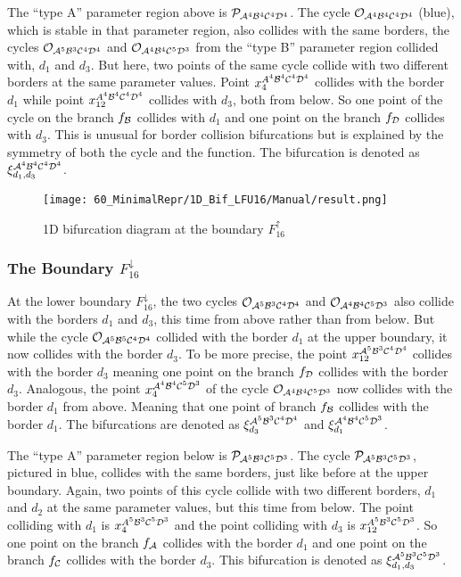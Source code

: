 The ``type A'' parameter region above is $\mathcal{P}_{\mathcal{A}^4\mathcal{B}^4\mathcal{C}^4\mathcal{D}^4}$.
The cycle $\mathcal{O}_{\mathcal{A}^4\mathcal{B}^4\mathcal{C}^4\mathcal{D}^4}$ (blue), which is stable in that parameter region, also collides with the same borders, the cycles $\mathcal{O}_{\mathcal{A}^5\mathcal{B}^3\mathcal{C}^4\mathcal{D}^4}$ and $\mathcal{O}_{\mathcal{A}^4\mathcal{B}^4\mathcal{C}^5\mathcal{D}^3}$ from the ``type B'' parameter region collided with, $d_1$ and $d_3$.
But here, two points of the same cycle collide with two different borders at the same parameter values.
Point $x_{4}^{A^4\mathcal{B}^4\mathcal{C}^4\mathcal{D}^4}$ collides with the border $d_1$ while point $x_{12}^{A^4\mathcal{B}^4\mathcal{C}^4\mathcal{D}^4}$ collides with $d_3$, both from below.
So one point of the cycle on the branch $f_{\mathcal{B}}$ collides with $d_1$ and one point on the branch $f_{\mathcal{D}}$ collides with $d_3$.
This is unusual for border collision bifurcations but is explained by the symmetry of both the cycle and the function.
The bifurcation is denoted as $\xi_{d_1, d_3}^{\mathcal{A}^4\mathcal{B}^4\mathcal{C}^4\mathcal{D}^4}$.

\begin{figure}
	\centering
	\texttt{[image: 60\_MinimalRepr/1D\_Bif\_LFU16/Manual/result.png]}
	\label{fig:final.bifurcation.F.up}
	\caption{1D bifurcation diagram at the boundary $F_{16}^\uparrow$}
\end{figure}

\subsubsection{The Boundary $F_{16}^\downarrow$}
\label{sec:minrep.bif.D}

At the lower boundary $F_{16}^\downarrow$, the two cycles $\mathcal{O}_{\mathcal{A}^5\mathcal{B}^3\mathcal{C}^4\mathcal{D}^4}$ and $\mathcal{O}_{\mathcal{A}^4\mathcal{B}^4\mathcal{C}^5\mathcal{D}^3}$ also collide with the borders $d_1$ and $d_3$, this time from above rather than from below.
But while the cycle $\mathcal{O}_{\mathcal{A}^5\mathcal{B}^5\mathcal{C}^4\mathcal{D}^4}$ collided with the border $d_1$ at the upper boundary, it now collides with the border $d_3$.
To be more precise, the point $x_{12}^{\mathcal{A}^5\mathcal{B}^3\mathcal{C}^4\mathcal{D}^4}$ collides with the border $d_3$ meaning one point on the branch $f_{\mathcal{D}}$ collides with the border $d_3$.
Analogous, the point $x_{4}^{\mathcal{A}^4\mathcal{B}^4\mathcal{C}^5\mathcal{D}^3}$ of the cycle $\mathcal{O}_{\mathcal{A}^4\mathcal{B}^4\mathcal{C}^5\mathcal{D}^3}$ now collides with the border $d_1$ from above.
Meaning that one point of branch $f_{\mathcal{B}}$ collides with the border $d_1$. The bifurcations are denoted as $\xi_{d_3}^{\mathcal{A}^5\mathcal{B}^3\mathcal{C}^4\mathcal{D}^4}$ and $\xi_{d_1}^{\mathcal{A}^4\mathcal{B}^4\mathcal{C}^5\mathcal{D}^3}$.

The ``type A'' parameter region below is $\mathcal{P}_{\mathcal{A}^5\mathcal{B}^3\mathcal{C}^5\mathcal{D}^3}$.
The cycle $\mathcal{P}_{\mathcal{A}^5\mathcal{B}^3\mathcal{C}^5\mathcal{D}^3}$, pictured in blue, collides with the same borders, just like before at the upper boundary.
Again, two points of this cycle collide with two different borders, $d_1$ and $d_2$ at the same parameter values, but this time from below.
The point colliding with $d_1$ is $x_{4}^{A^5\mathcal{B}^3\mathcal{C}^5\mathcal{D}^3}$ and  the point colliding with $d_3$ is $x_{12}^{A^5\mathcal{B}^3\mathcal{C}^5\mathcal{D}^3}$.
So one point on the branch $f_{\mathcal{A}}$ collides with the border $d_1$ and one point on the branch $f_{\mathcal{C}}$ collides with the border $d_3$.
This bifurcation is denoted as $\xi_{d_1, d_3}^{\mathcal{A}^5\mathcal{B}^3\mathcal{C}^5\mathcal{D}^3}$.

